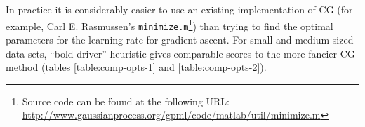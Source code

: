 	In practice it is considerably easier to  use an existing implementation of CG (for example, Carl E. Rasmussen's \texttt{minimize.m}\footnote{Source code can be found at the following URL: \url{http://www.gaussianprocess.org/gpml/code/matlab/util/minimize.m}}) than trying to find the optimal parameters for the learning rate for gradient ascent. For small and medium-sized data sets, ``bold driver'' heuristic gives comparable scores to the more fancier CG method (tables \ref{table:comp-opts-1} and \ref{table:comp-opts-2}).
	


